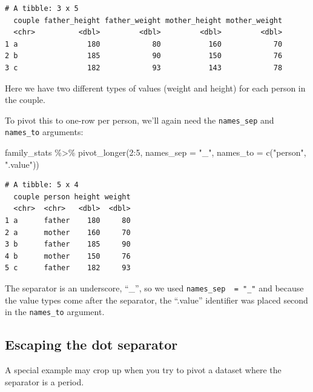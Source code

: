 \documentclass[
  letterpaper,
  DIV=11,
  numbers=noendperiod]{scrreprt}
\newenvironment{Shaded}{\begin{snugshade}}{\end{snugshade}}
\newcommand{\AttributeTok}[1]{\textcolor[rgb]{0.40,0.45,0.13}{#1}}
\newcommand{\DecValTok}[1]{\textcolor[rgb]{0.68,0.00,0.00}{#1}}
\newcommand{\FunctionTok}[1]{\textcolor[rgb]{0.28,0.35,0.67}{#1}}
\newcommand{\NormalTok}[1]{\textcolor[rgb]{0.00,0.23,0.31}{#1}}
\newcommand{\SpecialCharTok}[1]{\textcolor[rgb]{0.37,0.37,0.37}{#1}}
\newcommand{\StringTok}[1]{\textcolor[rgb]{0.13,0.47,0.30}{#1}}
\begin{document}
\begin{verbatim}
# A tibble: 3 x 5
  couple father_height father_weight mother_height mother_weight
  <chr>          <dbl>         <dbl>         <dbl>         <dbl>
1 a                180            80           160            70
2 b                185            90           150            76
3 c                182            93           143            78
\end{verbatim}

Here we have two different types of values (weight and height) for each
person in the couple.

To pivot this to one-row per person, we'll again need the
\texttt{names\_sep} and \texttt{names\_to} arguments:

\begin{Shaded}
\begin{Highlighting}[]
\NormalTok{family\_stats }\SpecialCharTok{\%\textgreater{}\%} 
  \FunctionTok{pivot\_longer}\NormalTok{(}\DecValTok{2}\SpecialCharTok{:}\DecValTok{5}\NormalTok{, }
               \AttributeTok{names\_sep  =} \StringTok{"\_"}\NormalTok{,}
               \AttributeTok{names\_to =} \FunctionTok{c}\NormalTok{(}\StringTok{"person"}\NormalTok{, }\StringTok{".value"}\NormalTok{))}
\end{Highlighting}
\end{Shaded}

\begin{verbatim}
# A tibble: 5 x 4
  couple person height weight
  <chr>  <chr>   <dbl>  <dbl>
1 a      father    180     80
2 a      mother    160     70
3 b      father    185     90
4 b      mother    150     76
5 c      father    182     93
\end{verbatim}

The separator is an underscore, ``\_'', so we used
\texttt{names\_sep\ \ =\ "\_"} and because the value types come after
the separator, the ``.value'' identifier was placed second in the
\texttt{names\_to} argument.

\subsection{Escaping the dot
separator}\label{escaping-the-dot-separator}

A special example may crop up when you try to pivot a dataset where the
separator is a period.
\end{document}
